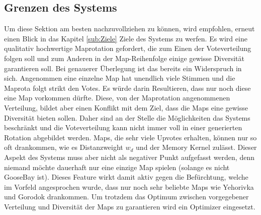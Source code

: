     \subsection{Grenzen des Systems}
        \label{s:grenzen_des_systems}
        Um diese Sektion am besten nachzuvollziehen zu können, wird empfohlen, erneut einen Blick in das Kapitel \ref{sub:Ziele} Ziele des Systems zu
        werfen. Es wird eine qualitativ hochwertige Maprotation gefordert, die zum Einen der Voteverteilung folgen soll und
        zum Anderen in der Map-Reihenfolge einige gewisse Diversität garantieren soll. Bei genauerer Überlegung ist
        das bereits ein Widerspruch in sich. Angenommen eine einzelne Map hat unendlich viele Stimmen und die Maprota
        folgt strikt den Votes. Es würde darin Resultieren, dass nur noch diese eine Map vorkommen dürfte. Diese, von
        der Maprotation angenommenen Verteilung, bildet aber einen Konflikt mit dem Ziel, dass die Maps eine gewisse Diversität
        bieten sollen. Daher sind an der Stelle die Möglichkeiten das Systems beschränkt und die Voteverteilung kann
        nicht immer voll in einer generierten Rotation abgebildet werden. Maps, die sehr viele Upvotes erhalten, können nur so oft drankommen,
        wie es Distanzweight $w_d$ und der Memory Kernel zulässt. Dieser Aspekt des Systems muss aber nicht als negativer Punkt
        aufgefasst werden, denn niemand möchte dauerhaft nur eine einzige Map spielen (solange es nicht GooseBay ist).
        Dieses \glqq{}Feature\grqq{} wirkt damit aktiv gegen die Befürchtung, welche im Vorfeld angesprochen wurde,
        dass nur noch sehr beliebte Maps wie Yehorivka und Gorodok drankommen.
        Um trotzdem das Optimum zwischen vorgegebener Verteilung und Diversität der Maps zu garantieren wird ein Optimizer
        eingesetzt.\\
